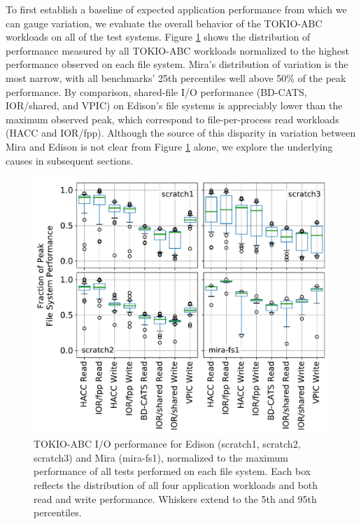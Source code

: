 To first establish a baseline of expected application performance from which we can gauge variation, we evaluate the overall behavior of the TOKIO-ABC workloads on all of the test systems.
Figure \ref{fig:perf-summary-boxplots-fs} shows the distribution of performance measured by all TOKIO-ABC workloads normalized to the highest performance observed on each file system.
Mira's distribution of variation is the most narrow, with all benchmarks' 25th percentiles well above 50\% of the peak performance.
By comparison, shared-file I/O performance (BD-CATS, IOR/shared, and VPIC) on Edison's file systems is appreciably lower than the maximum observed peak, which correspond to file-per-process read workloads (HACC and IOR/fpp).
Although the source of this disparity in variation between Mira and Edison is not clear from Figure \ref{fig:perf-summary-boxplots-fs} alone, we explore the underlying causes in subsequent sections.

\begin{figure}[t]
    \centering
    \includegraphics[width=1.0\columnwidth]{figs/perf-boxplots-per-fs.pdf}
    \caption{TOKIO-ABC I/O performance for Edison (scratch1, scratch2, scratch3) and Mira (mira-fs1), normalized to the maximum performance of all tests performed on each file system.
    Each box reflects the distribution of all four application workloads and both read and write performance.
    Whiskers extend to the 5th and 95th percentiles.}
    \label{fig:perf-summary-boxplots-fs}
\end{figure}


